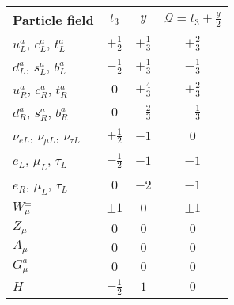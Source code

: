 \begin{tabular}{l|ccc}
   Particle field & $t_3$ & $y$ & $\mathcal{Q}=t_3+\frac{y}{2}$ \\ \hline
   $u^a_L$, $c^a_L$, $t^a_L$ & $+\frac{1}{2}$ & $+\frac{1}{3}$ & $+\frac{2}{3}$ \\
   $d^a_L$, $s^a_L$, $b^a_L$ & $-\frac{1}{2}$ & $+\frac{1}{3}$ & $-\frac{1}{3}$ \\
   $u^a_R$, $c^a_R$, $t^a_R$ & $0$ & $+\frac{4}{3}$ & $+\frac{2}{3}$ \\
   $d^a_R$, $s^a_R$, $b^a_R$ & $0$ & $-\frac{2}{3}$ & $-\frac{1}{3}$ \\
   \hline
   $\nu_{eL}$, $\nu_{{\mu}L}$, $\nu_{{\tau}L}$ & $+\frac{1}{2}$ & $-1$ & $0$ \\
   $e_L$, $\mu_L$, $\tau_L$ & $-\frac{1}{2}$ & $-1$ & $-1$ \\
   $e_R$, $\mu_L$, $\tau_L$ & $0$ & $-2$ & $-1$ \\
   \hline
   $W^{\pm}_\mu$ & $\pm 1$ & $0$ & $\pm 1$ \\
   $Z_\mu$ & $0$ & $0$ & $0$ \\
   $A_\mu$ & $0$ & $0$ & $0$ \\
   $G^a_{\mu}$ & $0$ & $0$ & $0$ \\
   \hline
   $H$ & $-\frac{1}{2}$ & $1$ & $0$
\end{tabular}